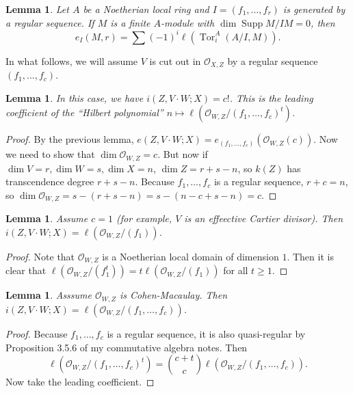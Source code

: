 \documentclass[leqno, openany]{memoir}
\newtheorem{lem}[thm]{Lemma}
\theoremstyle{definition}
\theoremstyle{remark}
\theoremstyle{plain}
\theoremstyle{definition}
\theoremstyle{remark}
\newcommand{\mc}[1]{\mathcal{#1}}
\DeclareMathOperator{\Supp}{Supp}
\DeclareMathOperator{\Tor}{Tor}
\begin{document}
\begin{lem} Let $A$ be a Noetherian local ring and $I = (f_1, \ldots, f_r)$ is
    generated by a regular sequence. If $M$ is a finite $A$-module with $\dim
    \Supp M/IM = 0$, then \[ e_I(M,r) = \sum {(-1)}^i \ell(\Tor_i^A(A/I, M)).
    \] \end{lem}

In what follows, we will assume $V$ is cut out in $\mc{O}_{X,Z}$ by a regular
sequence $(f_1, \ldots, f_c)$.  \begin{lem} In this case, we have $i(Z, V \cdot
    W; X) = c{!}$. This is the leading coefficient of the ``Hilbert
    polynomial'' $n \mapsto \ell(\mc{O}_{W,Z} / {(f_1, \ldots, f_c)}^t)$.
\end{lem}

\begin{proof} By the previous lemma, $e(Z, V \cdot W; X) = e_{(f_1, \ldots,
    f_c)}(\mc{O}_{W,Z}(c))$. Now we need to show that $\dim \mc{O}_{W,Z} = c$.
    But now if $\dim V = r, \dim W = s, \dim X = n$, $\dim Z = r+s-n$, so
    $k(Z)$ has transcendence degree $r+s-n$. Because $f_1, \ldots, f_c$ is a
    regular sequence, $r+c=n$, so $\dim \mc{O}_{W,Z} = s-(r+s-n) =
    s-(n-c+s-n)=c$.  \end{proof}

\begin{lem} Assume $c = 1$ (for example, $V$ is an effeective Cartier divisor).
Then $i(Z, V \cdot W;X) = \ell(\mc{O}_{W,Z} / (f_1))$.  \end{lem}

\begin{proof} Note that $\mc{O}_{W,Z}$ is a Noetherian local domain of
dimension $1$. Then it is clear that $\ell(\mc{O}_{W,Z}/(f_1^t)) = t
\ell(\mc{O}_{W,Z} / (f_1))$ for all $t \geq 1$.  \end{proof}

\begin{lem} Asssume $\mc{O}_{W,Z}$ is Cohen-Macaulay. Then $i(Z, V \cdot W; X)
= \ell(\mc{O}_{W,Z} / (f_1, \ldots, f_c))$.  \end{lem}

\begin{proof} Because $f_1, \ldots, f_c$ is a regular sequence, it is also
    quasi-regular by Proposition 3.5.6 of my commutative algebra notes. Then \[
    \ell(\mc{O}_{W,Z} / {(f_1, \ldots, f_c)}^t) = \binom{c+t}{c}
\ell(\mc{O}_{W,Z} / (f_1, \ldots, f_c)). \] Now take the leading coefficient.
\end{proof}
\end{document}
